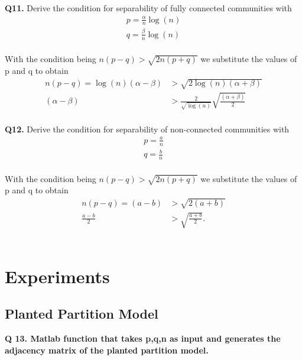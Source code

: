 \documentclass[9pt]{article}
\begin{document}
\textbf{Q11. } Derive the condition for separability of fully connected communities with 
\begin{align}
p = \frac{\alpha}{n} \log(n)\\
q = \frac{\beta}{n} \log(n)
\end{align}\\
With the condition being $n(p-q) > \sqrt{2n(p+q)}$ we substitute the values of p and q to obtain
\begin{align*}
n(p-q) = \log(n)(\alpha - \beta) &> \sqrt{2\log(n)(\alpha + \beta)}\\
(\alpha - \beta) &> \frac{2}{\sqrt{\log(n)}}\sqrt{\frac{(\alpha + \beta)}{2}}
\end{align*}\\

\textbf{Q12. }Derive the condition for separability of non-connected communities with 
\begin{align}
p = \frac{a}{n} \\
q = \frac{b}{n} 
\end{align}\\
With the condition being $n(p-q) > \sqrt{2n(p+q)}$ we substitute the values of p and q to obtain
\begin{align*}
n(p-q) = (a - b) &> \sqrt{2(a + b)}\\
\frac{a-b}{2} &> \sqrt{\frac{a+b}{2}}.
\end{align*}\\


\hrulefill

\section{Experiments}

\subsection{Planted Partition Model}

\textbf{Q 13. Matlab function that takes p,q,n as input and generates the adjacency matrix of the planted partition model. } 
\end{document}
